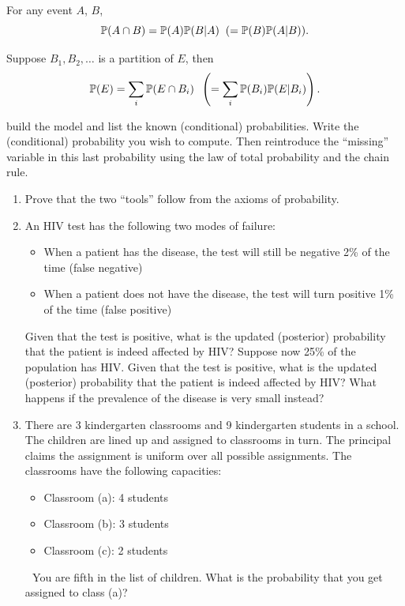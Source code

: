 \documentclass{article}
\begin{document}
 For any event $A$, $B$, 
\[\P(A \cap B) = \P(A) \P(B | A) \;\; (= \P(B) \P(A | B)).\] 

 Suppose $B_1, B_2, \dots$ is a partition of $E$, then
\[ \P(E) = \sum_i \P(E \cap B_i) \;\; \left(= \sum_i \P(B_i) \P(E | B_i)\right). \]

 build the model and list the known (conditional) probabilities. Write the (conditional) probability you wish to compute. Then reintroduce the ``missing'' variable in this last probability using the law of total probability and the chain rule.  

\begin{enumerate}
	\item Prove that the two ``tools'' follow from the axioms of probability.
	\item An HIV test has the following two modes of failure:
	\begin{itemize}
		\item When a patient has the disease, the test will still be negative 2\% of the time (false negative)
		\item When a patient does not have the disease, the test will turn positive 1\% of the time (false positive)
	\end{itemize}
	Given that the test is positive, what is the updated (posterior) probability that the patient is indeed affected by HIV?
	Suppose now 25\% of the population has HIV.
	Given that the test is positive, what is the updated (posterior) probability that the patient is indeed affected by HIV? What happens if the prevalence of the disease is very small instead?
	\item There are 3 kindergarten classrooms and 9 kindergarten students in a school. The children are lined up and assigned to classrooms in turn. The principal claims the assignment is uniform over all possible assignments. The classrooms 
	have the following capacities: 
	\begin{itemize}
		\item Classroom (a): 4 students 
		\item Classroom (b): 3 students
		\item Classroom (c): 2 students
	\end{itemize} 
	You are fifth in the list of children. What is the probability that you get assigned to class (a)? 
\end{enumerate}
\end{document}
